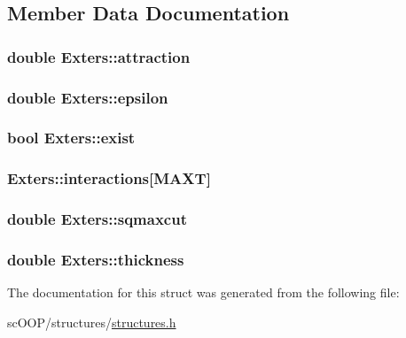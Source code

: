\subsection{Member Data Documentation}
\hypertarget{struct_exters_a3ace0154ce9823eaafe3e7d7c0ae71bc}{
\subsubsection[{attraction}]{\setlength{\rightskip}{0pt plus 5cm}double Exters\+::attraction}}\label{struct_exters_a3ace0154ce9823eaafe3e7d7c0ae71bc}
\hypertarget{struct_exters_ac6920553910e27bde3188120889e8381}{
\subsubsection[{epsilon}]{\setlength{\rightskip}{0pt plus 5cm}double Exters\+::epsilon}}\label{struct_exters_ac6920553910e27bde3188120889e8381}
\hypertarget{struct_exters_a78d759bd9da50ad5c4669dae9c6172ff}{
\subsubsection[{exist}]{\setlength{\rightskip}{0pt plus 5cm}bool Exters\+::exist}}\label{struct_exters_a78d759bd9da50ad5c4669dae9c6172ff}
\hypertarget{struct_exters_adecb24b99a4014cd45182172733493b7}{
\subsubsection[{interactions}]{ Exters\+::interactions\mbox{[}{\bf M\+A\+X\+T}\mbox{]}}}\label{struct_exters_adecb24b99a4014cd45182172733493b7}
\hypertarget{struct_exters_ae4e012e33e40f87ef88b08072bdf2d07}{
\subsubsection[{sqmaxcut}]{\setlength{\rightskip}{0pt plus 5cm}double Exters\+::sqmaxcut}}\label{struct_exters_ae4e012e33e40f87ef88b08072bdf2d07}
\hypertarget{struct_exters_a6ac0235fe365f41ca035957b748c9564}{
\subsubsection[{thickness}]{\setlength{\rightskip}{0pt plus 5cm}double Exters\+::thickness}}\label{struct_exters_a6ac0235fe365f41ca035957b748c9564}


The documentation for this struct was generated from the following file\+:\begin{DoxyCompactItemize}
\item 
sc\+O\+O\+P/structures/\hyperlink{structures_8h}{structures.\+h}\end{DoxyCompactItemize}
